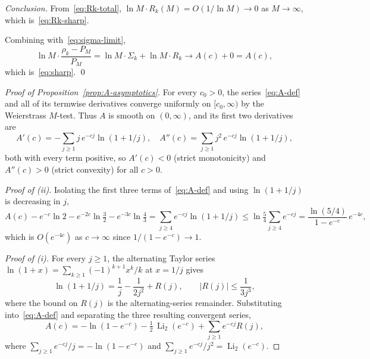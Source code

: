 \documentclass[11pt]{article}
\theoremstyle{remark}
\DeclareMathOperator{\Li}{Li}
\begin{document}
\emph{Conclusion.}
From~\eqref{eq:Rk-total}, $\ln M \cdot R_k(M) = O(1/\ln M) \to 0$ as $M \to \infty$, which is~\eqref{eq:Rk-sharp}.

Combining with~\eqref{eq:sigma-limit},
\[
\ln M \cdot \frac{\rho_k - P_M}{P_M} = \ln M \cdot \Sigma_k + \ln M \cdot R_k \longrightarrow A(c) + 0 = A(c),
\]
which is~\eqref{eq:sharp}. \qed

\begin{proof}[Proof of Proposition~\ref{prop:A-asymptotics}]
For every $c_0>0$, the series~\eqref{eq:A-def} and all of its termwise derivatives converge uniformly on $[c_0,\infty)$ by the Weierstrass $M$-test. Thus $A$ is smooth on $(0,\infty)$, and its first two derivatives are
\[
A'(c) = -\sum_{j \geq 1} j\, e^{-cj} \ln(1 + 1/j), \quad A''(c) = \sum_{j \geq 1} j^2\, e^{-cj} \ln(1 + 1/j),
\]
both with every term positive, so $A'(c) < 0$ (strict monotonicity) and $A''(c) > 0$ (strict convexity) for all $c > 0$.

\emph{Proof of (ii).} Isolating the first three terms of~\eqref{eq:A-def} and using $\ln(1 + 1/j)$ is decreasing in $j$,
\[
A(c) - e^{-c} \ln 2 - e^{-2c} \ln \tfrac{3}{2} - e^{-3c}\ln\tfrac{4}{3} = \sum_{j \geq 4} e^{-cj} \ln(1 + 1/j) \leq \ln \tfrac{5}{4} \sum_{j \geq 4} e^{-cj} = \frac{\ln(5/4)}{1 - e^{-c}}\, e^{-4c},
\]
which is $O(e^{-4c})$ as $c \to \infty$ since $1/(1 - e^{-c}) \to 1$.

\emph{Proof of (i).} For every $j \geq 1$, the alternating Taylor series $\ln(1 + x) = \sum_{k \geq 1}(-1)^{k+1} x^k/k$ at $x = 1/j$ gives
\begin{equation}\label{eq:log-Taylor}
\ln(1 + 1/j) = \frac{1}{j} - \frac{1}{2j^2} + R(j), \qquad |R(j)| \leq \frac{1}{3 j^3},
\end{equation}
where the bound on $R(j)$ is the alternating-series remainder. Substituting into~\eqref{eq:A-def} and separating the three resulting convergent series,
\begin{equation}\label{eq:A-decomp}
A(c) = -\ln(1 - e^{-c}) - \tfrac12\, \Li_2(e^{-c}) + \sum_{j \geq 1} e^{-cj} R(j),
\end{equation}
where $\sum_{j \geq 1} e^{-cj}/j = -\ln(1 - e^{-c})$ and $\sum_{j \geq 1} e^{-cj}/j^2 = \Li_2(e^{-c})$.


\end{proof}
\end{document}
